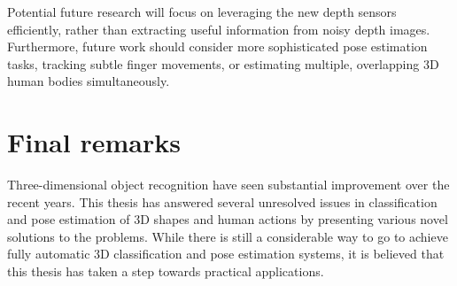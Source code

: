 Potential future research will focus on leveraging the new depth sensors efficiently, rather than extracting useful information from noisy depth images. 
Furthermore, future work should consider more sophisticated pose estimation tasks, \eg tracking subtle finger movements, or estimating multiple, overlapping 3D human bodies simultaneously.    




\section{Final remarks}
Three-dimensional object recognition have seen substantial improvement over the recent years.
This thesis has answered several unresolved issues in classification and pose estimation of 3D shapes and human actions by presenting various novel solutions to the problems. While there is still a considerable way to go to achieve fully automatic 3D classification and pose estimation systems, it is believed that this thesis has taken a step towards practical applications. 
